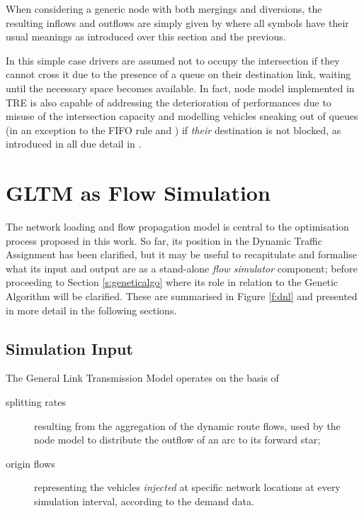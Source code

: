 When considering a generic node with both mergings and diversions, the resulting inflows and outflows are simply given by
where all symbols have their usual meanings as introduced over this section and the previous.

In this simple case drivers are assumed not to occupy the intersection if they cannot cross it due to the presence of a queue on their destination link, waiting until the necessary space becomes available. In fact, node model implemented in TRE is also capable of addressing the deterioration of performances due to misuse of the intersection capacity and modelling vehicles sneaking out of queues (in an exception to the FIFO rule and ) if \emph{their} destination is not blocked, as introduced in all due detail in \citep{tiddi2012models}.


\section{GLTM as Flow Simulation} \label{s:gltmflowsim}
The network loading and flow propagation model is central to the optimisation process proposed in this work.
So far, its position in the Dynamic Traffic Assignment has been clarified, but it may be useful to recapitulate and formalise what its input and output are as a stand-alone \emph{flow simulator} component; before proceeding to Section \ref{s:geneticalgo} where its role in relation to the Genetic Algorithm will be clarified. These are summarised in Figure \ref{f:dnl} and presented in more detail in the following sections.


\subsection{Simulation Input}
The General Link Transmission Model operates on the basis of
\begin{description}
\item[splitting rates] resulting from the aggregation of the dynamic route flows, used by the node model to distribute the outflow of an arc to its forward star;
\item[origin flows] representing the vehicles \emph{injected} at specific network locations at every simulation interval, according to the demand data.
\end{description}

